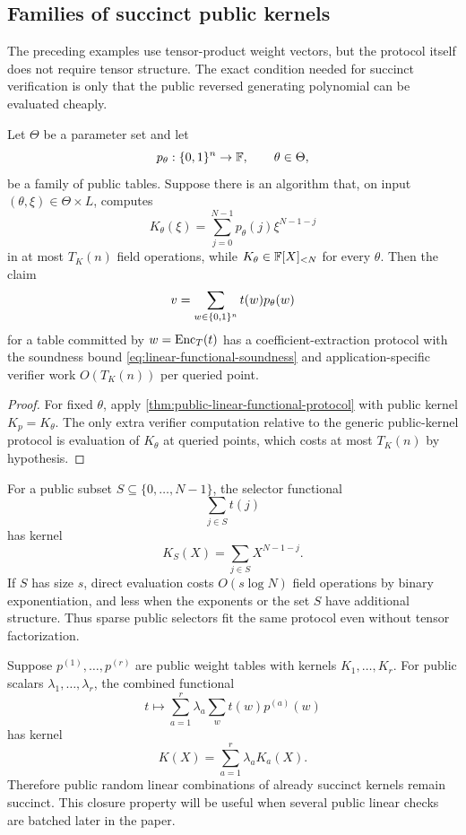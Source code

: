 \subsection{Families of succinct public kernels}
\label{sec:succinct-public-kernel-applications}

The preceding examples use tensor-product weight vectors, but the protocol itself does not require tensor structure.  The exact condition needed for succinct verification is only that the public reversed generating polynomial can be evaluated cheaply.

\begin{proposition}
\label{prop:public-kernel-family-principle}
Let \(\Theta\) be a parameter set and let
\[
  p_\theta:\{0,1\}^n\to\mathbb{F},
  \qquad
  \theta\in\Theta,
\]
be a family of public tables.  Suppose there is an algorithm that, on input \((\theta,\xi)\in\Theta\times L\), computes
\[
  K_\theta(\xi)
  =\sum_{j=0}^{N-1}p_\theta(j)\xi^{N-1-j}
\]
in at most \(T_K(n)\) field operations, while \(K_\theta\in\mathbb{F}[X]_{<N}\) for every \(\theta\).  Then the claim
\[
  v=\sum_{w\in\{0,1\}^n}t(w)p_\theta(w)
\]
for a table committed by \(w=\operatorname{Enc}_T(t)\) has a coefficient-extraction protocol with the soundness bound \eqref{eq:linear-functional-soundness} and application-specific verifier work \(O(T_K(n))\) per queried point.
\end{proposition}

\begin{proof}
For fixed \(\theta\), apply \cref{thm:public-linear-functional-protocol} with public kernel \(K_p=K_\theta\).  The only extra verifier computation relative to the generic public-kernel protocol is evaluation of \(K_\theta\) at queried points, which costs at most \(T_K(n)\) by hypothesis.
\end{proof}

\begin{example}
\label{ex:selector-kernel}
For a public subset \(S\subseteq\{0,\ldots,N-1\}\), the selector functional
\[
  \sum_{j\in S}t(j)
\]
has kernel
\[
  K_S(X)=\sum_{j\in S}X^{N-1-j}.
\]
If \(S\) has size \(s\), direct evaluation costs \(O(s\log N)\) field operations by binary exponentiation, and less when the exponents or the set \(S\) have additional structure.  Thus sparse public selectors fit the same protocol even without tensor factorization.
\end{example}

\begin{example}
\label{ex:affine-kernel-combination}
Suppose \(p^{(1)},\ldots,p^{(r)}\) are public weight tables with kernels \(K_1,\ldots,K_r\).  For public scalars \(\lambda_1,\ldots,\lambda_r\), the combined functional
\[
  t\longmapsto
  \sum_{a=1}^{r}\lambda_a\sum_w t(w)p^{(a)}(w)
\]
has kernel
\[
  K(X)=\sum_{a=1}^{r}\lambda_aK_a(X).
\]
Therefore public random linear combinations of already succinct kernels remain succinct.  This closure property will be useful when several public linear checks are batched later in the paper.
\end{example}

